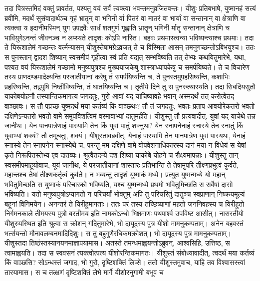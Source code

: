 \vakya तदा पित्रस्तमिदं वक्तुं प्रावर्तत, पश्यतु वयं सर्वं त्यक्त्वा भवन्तमनुव्रजितवन्तः।
\vakya यीशुः प्रतिबभाषे, युष्मानहं सत्यं ब्रवीमि, मदर्थं सुसंवादार्थञ्च गृहं भ्रातॄन् वा भगिनी र्वा पितरं वा मातरं वा भार्यां वा सन्तानान् वा क्षेत्राणि वा त्यक्त्वा
\vakya य इदानीमस्मिन् युग उपद्रवैः सार्धं शतगुणं गृह्णाति भ्रातॄन् भगिनी र्मातॄ सन्तानान् क्षेत्राणि च भावियुगेऽनन्तं जीवनञ्च न लप्स्यते तादृशः कोऽपि नास्ति।
\vakya बहवः प्रथमास्त्वन्या भविष्यन्त्याश्च प्रथमाः।
\vakya तदा ते यिरूशालेमं गच्छन्तः वर्त्मन्यासन् यीशुस्तेषामग्रेऽव्रजत् ते च विस्मिता आसन् तमनुगच्छन्तोऽबिभयुश्च। ततः स पुनस्तान् द्वादश शिष्यान् स्वसमीपं गृहीत्वा स्वं प्रति यद्यत् सम्भविष्यति तत् तेभ्यः कथयितुमारेभे, यथा, पश्यत वयं यिरूशालेमं गच्छामो मनुष्यपुत्रश्च मुख्ययाजकेषु शास्त्राध्यापकेषु च समर्पयिष्यते।
\vakya ते च विचारेण तस्य प्राणदण्डमादेक्ष्यन्ति परजातीयानां करेषु तं समर्पयिष्यन्ति च,
\vakya ते पुनस्तमुपहसिष्यन्ति, कशाभिः प्रहरिष्यन्ति, तद्वपुषि निष्ठीविष्यन्ति, तं घातयिष्यन्ति च। तृतीये दिने तु स पुनरुत्थास्यति।
\vakya तदा सिबदियसुतौ याकोबयोहनौ तस्यान्तिकमागत्य जगदतुः, गुरो आवां यद् याचिष्यावहे भवान् अस्मदर्थं तत् करोत्वेतद् वाञ्छावः।
\vakya स तौ पप्रच्छ युष्मदर्थं मया कर्तव्यं किं वाञ्छथः?
\vakya तौ तं जगदतुः, भवतः प्रताप आवयोरेकतरो भवतो दक्षिणेऽन्यतरो भवतो वामे समुपविशत्विमं वरमावाभ्यां दातुमर्हति।
\vakya यीशुस्तु तौ प्रत्यवादीत्, युवां यद् याचेथे तन्न जानीथः। येन पानपात्रेणाहं पास्यामि तेन किं युवां पातुं शक्नुथः? येन स्नापनेनाहं स्नास्ये तेन स्नातुं किं युवाभ्यां शक्यं?
\vakya तौ तमूचतुः, शक्यं। यीशुस्तावब्रवीत्, येनाहं पास्यामि तेन पानपात्रेण युवां पास्यथः, येनाहं स्नास्ये तेन स्नापनेन स्नास्येथे च,
\vakya परन्तु मम दक्षिणे वामे वोपवेशनाधिकारस्य दानं मया न विधेयं स येषां कृते निरूपितस्तेभ्य एव दातव्यः।
\vakya श्रुत्वैतदन्ये दश शिष्या याकोबे योहने च रौक्ष्यमापन्नाः।
\vakya यीशुस्तु तान् स्वसमीपमाहूयोवाच, यूयं जानीथ, ये परजातीयानां शास्तारः प्रतिभान्ति ते तेषामुपरि तीक्ष्णप्रभुत्वं कुर्वते, महान्तश्च तेषां तीक्ष्णकर्तृत्वं कुर्वते।
\vakya न भव्यन्तु तादृशं युष्माकं मध्ये। प्रत्युत युष्मन्मध्ये यो महान् भवितुमिच्छति स युष्माकं परिचारको भविष्यति,
\vakya यश्च युष्मन्मध्ये प्रथमो भवितुमिच्छति स सर्वेषां दासो भविष्यति।
\vakya यतो मनुष्यपुत्रोऽप्यागतो न परिचर्यां भोक्तुम् अपि तु परिचरितुं दातुञ्च स्वप्राणान् निष्क्रयमूल्यं बहूनां विनिमयेन।
\vakya अनन्तरं ते यिरीहुमागताः। ततः परं तस्य तच्छिष्याणां महतो जननिवहस्य च यिरीहुतो निर्गमनकाले तीमयस्य पुत्रो बरतीमय इति नामकोऽन्धो भिक्षमाणः पथपार्श्व उपविष्ट आसीत्।
\vakya नासरतीयो यीशुरुपस्थित इति श्रुत्वा स क्रोशन् गदितुमारेभे, भो दायूदस्य पुत्र यीशो मामनुकम्पताम्।
\vakya अनेन बहवस्तं भर्त्सयन्तो मौनावलम्बनमादिदिशुः। स तु बहुगुणैरधिकमक्रोशत्। भो दायूदस्य पुत्र मामनुकम्पताम्।
\vakya यीशुस्तदा तिष्ठंस्तस्यानयनमाज्ञापयामास। अतस्ते तमन्धमाह्वयन्तोऽब्रुवन्, आश्वसिहि, उत्तिष्ठ, स त्वामाह्वयति।
\vakya तदा स स्ववसनं त्यक्त्वोत्पत्य यीशोरन्तिकमागतः।
\vakya यीशुस्तं संबोध्यावादीत्, त्वदर्थं मया कर्तव्यं किं वाञ्छसि? सोऽन्धस्तं जगाद, भो गुरो, दृष्टिशक्तिं लिप्से।
\vakya ततो यीशुस्तमुवाच, याहि तव विश्वासस्त्वां तारयामास। स च तत्क्षणं दृष्टिशक्तिं लेभे मार्गे यीशोरनुगामी बभूव च\eoc